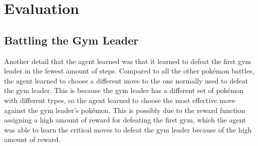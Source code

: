 \section{Evaluation}

\subsection{Battling the Gym Leader}

Another detail that the agent learned was that it learned to defeat the first gym leader in the fewest amount of steps. Compared to all the other pokémon battles, the agent learned to choose a different move to the one normally used to defeat the gym leader. This is because the gym leader has a different set of pokémon with different types, so the agent learned to choose the most effective move against the gym leader's pokémon. This is possibly due to the reward function assigning a high amount of reward for defeating the first gym, which the agent was able to learn the critical moves to defeat the gym leader because of the high amount of reward. 